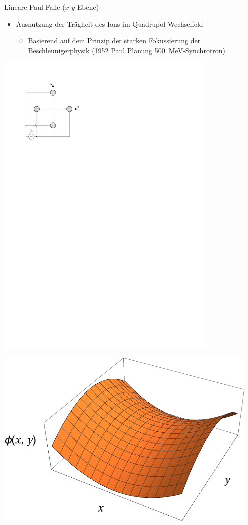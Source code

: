 \documentclass[12pt,xcolor=dvipsnames]{beamer}
\begin{document}
\begin{frame}{Lineare Paul-Falle ($x$-$y$-Ebene)}
	\begin{itemize}
		\item Ausnutzung der Trägheit des Ions im Quadrupol-Wechselfeld
		\begin{itemize}
			\item Basierend auf dem Prinzip der starken Fokussierung der Beschleunigerphysik (1952 Paul Planung \SI{500}{MeV}-Synchrotron)
		\end{itemize}
	\end{itemize}
	
	
	\begin{minipage}[t]{0.5\textwidth}
		\centering
		\includegraphics[width=0.8\textwidth]{./figures/lineare_paulfalle_xy.pdf}
	\end{minipage}%
	\begin{minipage}[t]{0.5\textwidth}
		\centering
		\includegraphics[width=0.95\textwidth]{./figures/sattelpotential.pdf}
	\end{minipage}
\end{frame}
\end{document}
